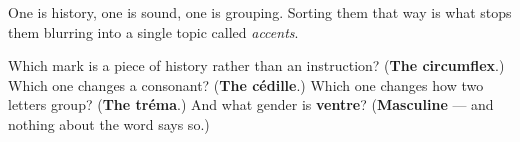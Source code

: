 One is history, one is sound, one is grouping. Sorting them that way is what stops them blurring into a single topic called \emph{accents}.

\begin{tcolorbox}[breakable,colback=teal!4,colframe=teal!35!black,title={Before you move on}]
Which mark is a piece of history rather than an instruction? (\textbf{The circumflex}.) Which one changes a consonant? (\textbf{The cédille}.) Which one changes how two letters group? (\textbf{The tréma}.) And what gender is \textbf{ventre}? (\textbf{Masculine} — and nothing about the word says so.)
\end{tcolorbox}
